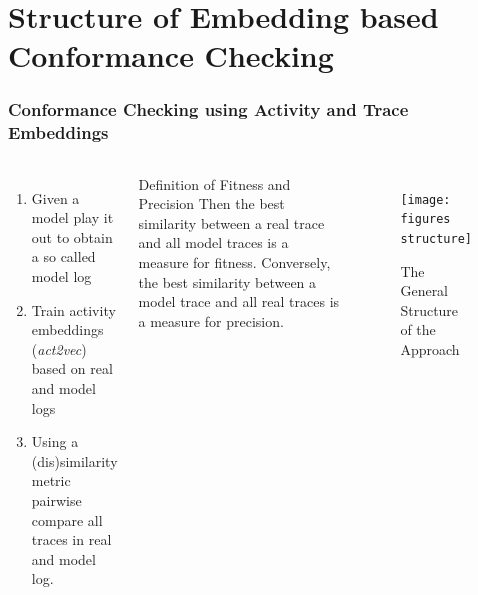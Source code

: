 \documentclass{beamer}
\newcommand{\figures}{../figures/}
\begin{document}
	\section{Structure of Embedding based Conformance Checking}
	\begin{frame}
		\frametitle{Conformance Checking using Activity and Trace Embeddings}
		\begin{columns}
			\begin{enumerate}
				\item Given a model play it out to obtain a so called model log
				\item Train activity embeddings (\emph{act2vec}) based on real and model logs
				\item Using a (dis)similarity metric pairwise compare all traces in real and model log.
			\end{enumerate}
			\begin{block}{Definition of Fitness and Precision}
				Then the best similarity between a real trace and all model traces is a measure for fitness. Conversely, the best similarity between a model trace and all real traces is a measure for precision.
			\end{block}
		\begin{figure}
			\texttt{[image: \\figures structure]}
			\caption{The General Structure of the Approach}
			\label{fig:structure}
		\end{figure}
	\end{columns}
	\end{frame}
	
\end{document}
